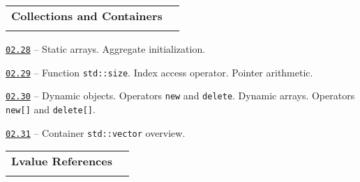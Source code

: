 \documentclass[a4paper,12pt]{article}
\renewenvironment{itemize}
{
    \begin{list}{\labelitemi}
    {
      \setlength{\topsep}{0pt}
      \setlength{\partopsep}{0pt}
      \setlength{\parskip}{0pt}
      \setlength{\itemsep}{0pt}
      \setlength{\parsep}{0pt}
      \setlength{\leftmargin}{14.5pt}
    }
}{\end{list}}
\begin{document}
\bigskip\medskip

\begin{tabular}{!{\vrule width 1pt}L{5.3cm}!{\vrule width 1pt}L{13.7cm}!{\vrule width 0pt}} 


\textbf{Collections and Containers} & \\


\end{tabular}

\medskip\smallskip

\begin{itemize}

    \item \href{https://github.com/i-s-m-mipt/Education/blob/master/projects/examples/source/02.28.cpp}{\texttt{02.28}} -- Static arrays. Aggregate initialization.

    \smallskip

    \item \href{https://github.com/i-s-m-mipt/Education/blob/master/projects/examples/source/02.29.cpp}{\texttt{02.29}} -- Function \lstinline{std::size}. Index access operator. Pointer arithmetic.

    \smallskip

    \item \href{https://github.com/i-s-m-mipt/Education/blob/master/projects/examples/source/02.30.cpp}{\texttt{02.30}} -- Dynamic objects. Operators \lstinline{new} and \lstinline{delete}. Dynamic arrays. Operators \lstinline{new[]} and \lstinline{delete[]}.

    \smallskip

    \item \href{https://github.com/i-s-m-mipt/Education/blob/master/projects/examples/source/02.31.cpp}{\texttt{02.31}} -- Container \lstinline{std::vector} overview.

\end{itemize}

\bigskip\medskip

\begin{tabular}{!{\vrule width 1pt}L{3.6cm}!{\vrule width 1pt}L{15.4cm}!{\vrule width 0pt}} 


\textbf{Lvalue References} & \\


\end{tabular}
\end{document}
